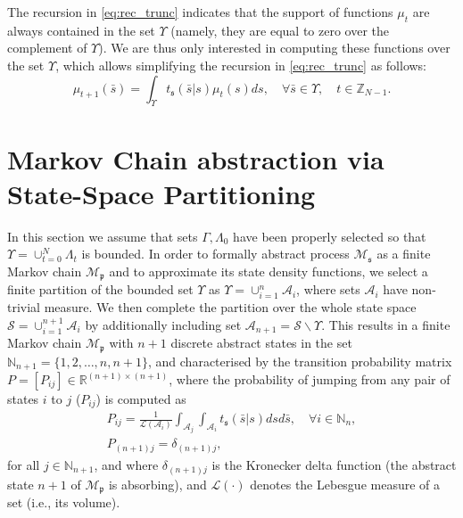 \documentclass{LMCS}
\begin{document}
The recursion in \eqref{eq:rec_trunc} indicates that the support of functions $\mu_t$ are always contained in the set $\Upsilon$ (namely, they are equal to zero over the complement of $\Upsilon$). 
We are thus only interested in computing these functions over the set $\Upsilon$,  
which allows
simplifying the recursion in \eqref{eq:rec_trunc} as follows:  
\begin{equation}
\label{eq:recursive_RA2}
\mu_{t+1}(\bar s)=\int_{\Upsilon}t_{\mathfrak s}(\bar s|s)\mu_{t}(s)ds,\quad\forall \bar s\in \Upsilon,\quad t \in \mathbb Z_{N-1}.
\end{equation}

\section{Markov Chain abstraction via State-Space Partitioning}
\label{sec:partition}
In this section we assume that sets $\varGamma,\Lambda_0$ have been properly selected so that $\Upsilon = \cup_{t=0}^{N}\Lambda_t$ is bounded.
In order to formally abstract process $\mathscr M_{\mathfrak s}$ as a finite Markov chain $\mathscr M_{\mathfrak p}$ and to approximate its state density functions,
we select a finite partition of the bounded set $\Upsilon$ as $\Upsilon = \cup_{i=1}^n \mathcal A_i$, 
where sets $\mathcal A_i$ have non-trivial measure.   
We then complete the partition over the whole state space $\mathcal S = \cup_{i=1}^{n+1}\mathcal A_i$ 
by additionally including set $\mathcal A_{n+1} = \mathcal S\backslash\Upsilon$.  
This results in a finite Markov chain $\mathscr M_{\mathfrak p}$ with $n+1$ discrete abstract states in the set $\mathbb N_{n+1} = \{1,2,\ldots,n,n+1\}$, 
and characterised by the transition probability matrix $P = [P_{ij}]\in\mathbb R^{(n+1)\times(n+1)}$,
where the probability of jumping from any pair of states $i$ to $j$ ($P_{ij}$) is computed as 
\begin{equation}
\label{eq:trans_elem}
\begin{array}{l}
P_{ij} = \frac{1}{\mathcal L(\mathcal A_i)}\int_{\mathcal A_j}\int_{\mathcal A_i}t_{\mathfrak s}(\bar s|s)ds d\bar s,\quad\forall i\in\mathbb N_n,\\ 
P_{(n+1)j} = \delta_{(n+1)j}, 
\end{array}
\end{equation}
for all $j\in\mathbb N_{n+1}$, 
and where $\delta_{(n+1)j}$ is the Kronecker delta function (the abstract state $n+1$ of $\mathscr M_{\mathfrak p}$ is absorbing), 
and $\mathcal L(\cdot)$ denotes the Lebesgue measure of a set (i.e., its volume).    
\end{document}
